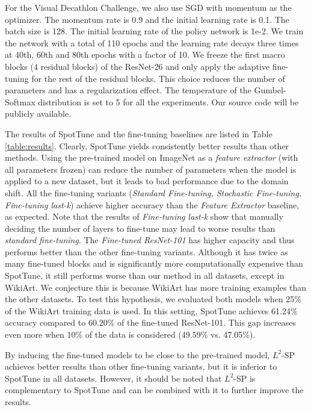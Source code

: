 \documentclass[10pt,twocolumn,letterpaper]{article}
\begin{document}
For the Visual Decathlon Challenge, we also use SGD with momentum as the optimizer. The momentum rate is 0.9 and the initial learning rate is 0.1. The batch size is 128.  The initial learning rate of the policy network is 1e-2. We train the network with a total of 110 epochs and the learning rate decays three times at 40th, 60th and 80th epochs with a factor of 10. We freeze the first macro blocks (4 residual blocks) of the ResNet-26 and only apply the adaptive fine-tuning for the rest of the residual blocks. This choice reduces the number of parameters and has a regularization effect. The temperature of the Gumbel-Softmax distribution is set to 5 for all the experiments. Our source code will be publicly available.

The results of SpotTune and the fine-tuning baselines are listed in Table \ref{table:results}. Clearly, SpotTune yields consistently better results than other methods. Using the pre-trained model on ImageNet as a {\em feature extractor} (with all parameters frozen) can reduce the number of parameters when the model is applied to a new dataset, but it leads to bad performance due to the domain shift. All the fine-tuning variants ({\em Standard Fine-tuning, Stochastic Fine-tuning, Fine-tuning last-k}) achieve higher accuracy than the {\em Feature Extractor} baseline, as expected. Note that the results of {\em Fine-tuning last-k} show that manually deciding the number of layers to fine-tune may lead to worse results than {\em standard fine-tuning}. 
The {\em Fine-tuned ResNet-101} has higher capacity and thus performs better than the other fine-tuning variants. Although it has twice as many fine-tuned blocks and is significantly more computationally expensive than SpotTune, it still performs worse than our method in all datasets, except in WikiArt. We conjecture this is because WikiArt has more training examples than the other datasets. To test this hypothesis, we evaluated both models when 25\% of the WikiArt training data is used. In this setting, SpotTune achieves 61.24\% accuracy compared to 60.20\% of the fine-tuned ResNet-101. This gap increases even more when 10\% of the data is considered (49.59\% vs. 47.05\%).

By inducing the fine-tuned models to be close to the pre-trained model, $L^2$-SP achieves better results than other fine-tuning variants, but it is inferior to SpotTune in all datasets. However, it should be noted that $L^2$-SP is complementary to SpotTune and can be combined with it to further improve the results.
\end{document}

